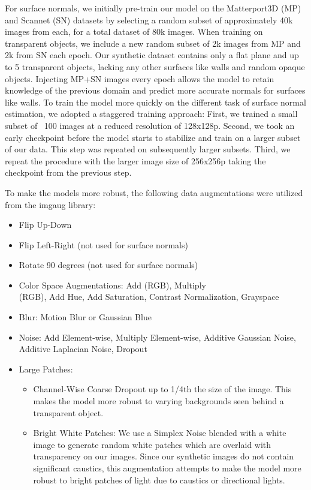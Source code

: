 \documentclass[letterpaper, 10 pt, conference]{ieeeconf}
\begin{document}
For surface normals, we initially pre-train our model on the Matterport3D (MP) and Scannet (SN) datasets by selecting a random subset of approximately 40k images from each, for a total dataset of 80k images. When training on transparent objects, we include a new random subset of 2k images from MP and 2k from SN each epoch. Our synthetic dataset contains only a flat plane and up to 5 transparent objects, lacking any other surfaces like walls and random opaque objects. Injecting MP+SN images every epoch allows the model to retain knowledge of the previous domain and predict more accurate normals for surfaces like walls.
To train the model more quickly on the different task of surface normal estimation, we adopted a staggered training approach: First, we trained a small subset of ~100 images at a reduced resolution of 128x128p. Second, we took an early checkpoint before the model starts to stabilize and train on a larger subset of our data. This step was repeated on subsequently larger subsets. Third, we repeat the procedure with the larger image size of 256x256p taking the checkpoint from the previous step.

To make the models more robust, the following data augmentations were utilized from the imgaug \cite{imgaug} library:
\begin{itemize}[leftmargin=*]
\item Flip Up-Down
\item Flip Left-Right (not used for surface normals)
\item Rotate 90 degrees (not used for surface normals)
\item Color Space Augmentations: Add (RGB), Multiply \\
(RGB), Add Hue, Add Saturation, Contrast Normalization, Grayspace
\item Blur: Motion Blur or Gaussian Blue
\item Noise: Add Element-wise, Multiply Element-wise, Additive Gaussian Noise, Additive Laplacian Noise, Dropout
\item Large Patches: 
    \begin{itemize}
         \item Channel-Wise Coarse Dropout up to 1/4th the size of the image. This makes the model more robust to varying backgrounds seen behind a transparent object.
         \item Bright White Patches: We use a Simplex Noise blended with a white image to generate random white patches which are overlaid with transparency on our images. Since our synthetic images do not contain significant caustics, this augmentation attempts to make the model more robust to bright patches of light due to caustics or directional lights.
    \end{itemize}
\end{itemize}
\end{document}
